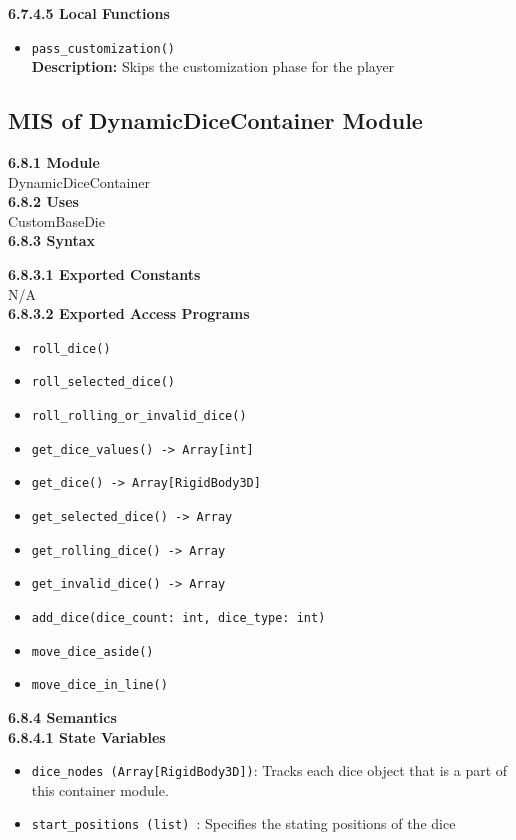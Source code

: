 \documentclass[12pt, titlepage]{article}
\begin{document}
\textbf{6.7.4.5 Local Functions}

\begin{itemize}
    \item \texttt{pass\_customization()}\\
    	\textbf{Description:} Skips the customization phase for the player
\end{itemize}


\subsection{MIS of DynamicDiceContainer Module}
\textbf{6.8.1 Module}\\
 DynamicDiceContainer\\

\noindent \textbf{6.8.2 Uses}\\
CustomBaseDie \\

\noindent \textbf{6.8.3 Syntax}

\noindent \textbf{6.8.3.1 Exported Constants}\\
N/A\\

\textbf{6.8.3.2 Exported Access Programs}
\begin{itemize}
	\item \texttt{roll\_dice() }
	\item \texttt{roll\_selected\_dice() }
	\item \texttt{roll\_rolling\_or\_invalid\_dice() }
	\item \texttt{get\_dice\_values() -> Array[int] }
	\item \texttt{get\_dice() -> Array[RigidBody3D]  }
	\item \texttt{get\_selected\_dice() -> Array }
	\item \texttt{get\_rolling\_dice() -> Array }
	\item \texttt{get\_invalid\_dice() -> Array  }
	\item \texttt{add\_dice(dice\_count: int, dice\_type: int)}
	\item \texttt{move\_dice\_aside() }
	\item \texttt{move\_dice\_in\_line() }
	
\end{itemize}

\noindent \textbf{6.8.4 Semantics}\\
\textbf{6.8.4.1 State Variables}\\
\begin{itemize}
	\item \texttt{dice\_nodes (Array[RigidBody3D])}: Tracks each dice object that is a part of this container module.
	\item \texttt{start\_positions (list) }: Specifies the stating positions of the dice

\end{itemize}
\end{document}
